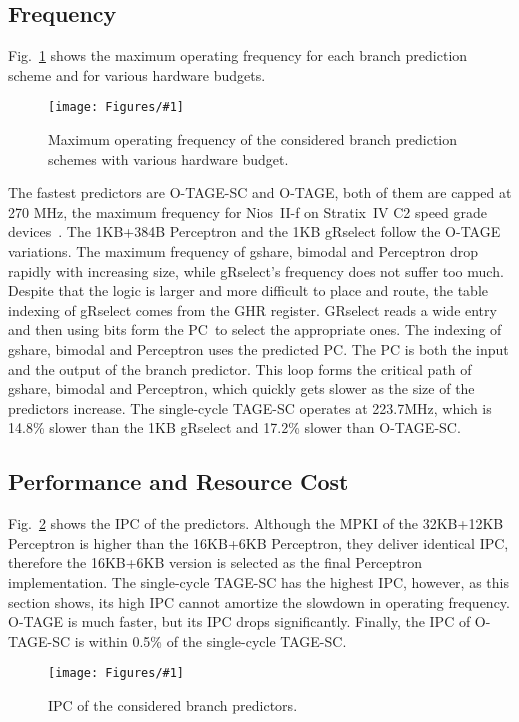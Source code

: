\documentclass[conference]{IEEEtran}
\newcommand{\kfig}[4]{ %
        \begin{figure}[!t]
        \centering
        \texttt{[image: Figures/\#1]}
        \vspace{-1mm}
        \caption{#3}
        \label{#2}
        \end{figure}
}
\begin{document}
\subsection{Frequency}
\label{sec:eval:fmax}
Fig.~\ref{fig:adfmax} shows the maximum operating frequency for each branch prediction scheme and for various hardware budgets.
\kfig{adfmax.pdf}{fig:adfmax}{Maximum operating frequency of the considered branch prediction schemes with various hardware budget.}{angle = 0, trim = 0.8in 4.6in 0.7in 5.2in, clip, width=0.5\textwidth}

The fastest predictors are \mbox{O-TAGE-SC} and \mbox{O-TAGE}, both of them are capped at 270 MHz, the maximum frequency for Nios~II-f on Stratix~IV C2 speed grade devices~\cite{niosfmax}. The 1KB+384B Perceptron and the 1KB gRselect follow the \mbox{O-TAGE} variations. The maximum frequency of gshare, bimodal and Perceptron drop rapidly with increasing size, while gRselect's frequency does not suffer too much. Despite that the logic is larger and more difficult to place and route,  the table indexing of gRselect comes from the GHR register. GRselect reads a wide entry and then using bits form the PC\ to select the appropriate ones. The indexing of gshare, bimodal and Perceptron uses  the predicted PC. The PC is both the input and the output of the branch predictor. This loop forms the critical path of gshare, bimodal and Perceptron, which quickly gets slower as the size of the predictors increase. The single-cycle \mbox{TAGE-SC} operates at 223.7MHz, which is 14.8\% slower than the 1KB gRselect and 17.2\% slower than \mbox{O-TAGE-SC}.

\subsection{Performance and Resource Cost}
\label{sec:eval:perf}
Fig.~\ref{fig:adipc} shows the IPC of the predictors. Although the MPKI of the 32KB+12KB Perceptron is higher than the 16KB+6KB Perceptron, they deliver identical IPC, therefore the 16KB+6KB version is selected as the final Perceptron implementation. The single-cycle \mbox{TAGE-SC} has the highest IPC, however, as this section shows, its high IPC cannot amortize the slowdown in operating frequency. \mbox{O-TAGE} is much faster, but its IPC drops significantly. Finally, the IPC of \mbox{O-TAGE-SC} is within 0.5\% of the single-cycle \mbox{TAGE-SC}.
\kfig{adipc.pdf}{fig:adipc}{IPC of the considered branch predictors.}{angle = 0, trim = 0.9in 2.9in 0.8in 2.9in, clip, width=0.5\textwidth}
\end{document}
